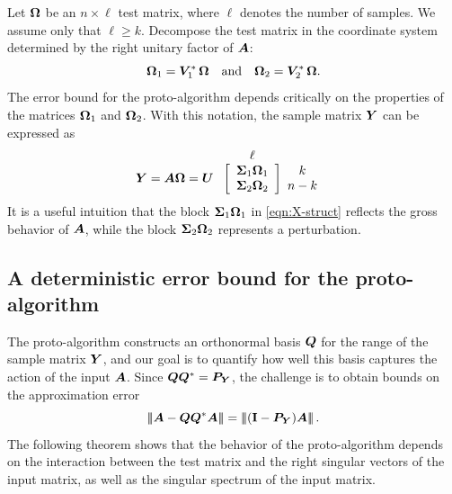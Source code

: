 \documentclass[final]{siamltex}
\newcounter{algorithm}[section]
\begin{document}
Let $\bm{\Omega}$ be an $n \times \ell$ test matrix, where $\ell$ denotes the number of samples.  We assume only that $\ell \geq k$.
Decompose the test matrix in the
coordinate system determined by the right unitary factor of
$\bm{A}$:
\begin{equation}
\label{eq:def_Omegaj}
\mtx{\Omega}_1 = \mtx{V}_1^\adj\, \mtx{\Omega} \quad\text{and}\quad
\mtx{\Omega}_2 = \mtx{V}_2^\adj\, \mtx{\Omega}.
\end{equation}
The error bound for the proto-algorithm depends critically on the
properties of the matrices $\bm{\Omega}_{1}$ and $\bm{\Omega}_{2}$.
With this notation, the sample matrix
$\bm{Y}$ can be expressed as
\begin{equation*} \label{eqn:X-struct}
    \begin{array}{@{}c@{}c@{}c}
    & \ell & \\
    \mtx{Y} = \mtx{A}\mtx{\Omega} =
        \mtx{U} \left. \begin{array}{@{}c} \\ \\ \end{array} \right[ &
    \begin{array}{c} \mtx{\Sigma}_1 \mtx{\Omega}_1 \\
    \mtx{\Sigma}_2 \mtx{\Omega}_2 \end{array} &
    \left] \begin{array}{c} k \\ n - k \end{array} \right.
    \end{array}
\end{equation*}
It is a useful intuition that
the block $\bm{\Sigma}_1 \bm{\Omega}_1$ in \eqref{eqn:X-struct} reflects the
gross behavior of $\bm{A}$, while the block $\bm{\Sigma}_2 \bm{\Omega}_2$
represents a perturbation.


\subsection{A deterministic error bound for the proto-algorithm}

The proto-algorithm constructs an orthonormal basis $\bm{Q}$
for the range of the sample matrix $\bm{Y}$, and our goal is
to quantify how well this basis captures the action of the
input $\bm{A}$.  Since $\bm{QQ}^* = \bm{P}_{\bm{Y}}$, the
challenge is to obtain bounds on the approximation error
$$
\triplenorm{ \mtx{A} - \mtx{QQ}^\adj \mtx{A} }
    =\triplenorm{ (\Id - \mtx{P}_{\mtx{Y}}) \mtx{A} }.
$$
The following theorem shows that the behavior of the proto-algorithm
depends on the interaction between the test matrix and the right singular
vectors of the input matrix, as well as the singular spectrum
of the input matrix.
\end{document}
